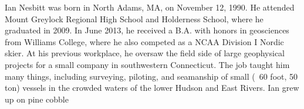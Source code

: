 \begin{biography}			%
Ian Nesbitt was born in North Adams, MA, on November 12, 1990. He attended Mount Greylock Regional High School and Holderness School, where he graduated in 2009. In June 2013, he received a B.A. with honors in geosciences from Williams College, where he also competed as a NCAA Division I Nordic skier. At his previous workplace, he oversaw the field side of large geophysical projects for a small company in southwestern Connecticut. The job taught him many things, including  surveying, piloting, and seamanship of small (~60 foot, 50 ton) vessels in the crowded waters of the lower Hudson and East Rivers. Ian grew up on pine cobble
\end{biography}

\endinput